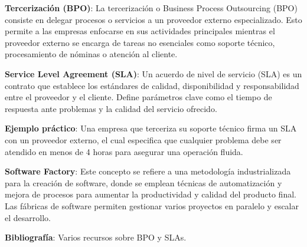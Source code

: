 \documentclass[a4paper,11pt]{article}
\begin{document}
\textbf{Tercerización (BPO)}: La tercerización o Business Process Outsourcing (BPO) consiste en delegar procesos o servicios a un proveedor externo especializado. Esto permite a las empresas enfocarse en sus actividades principales mientras el proveedor externo se encarga de tareas no esenciales como soporte técnico, procesamiento de nóminas o atención al cliente.

\textbf{Service Level Agreement (SLA)}: Un acuerdo de nivel de servicio (SLA) es un contrato que establece los estándares de calidad, disponibilidad y responsabilidad entre el proveedor y el cliente. Define parámetros clave como el tiempo de respuesta ante problemas y la calidad del servicio ofrecido.

\textbf{Ejemplo práctico}: Una empresa que terceriza su soporte técnico firma un SLA con un proveedor externo, el cual especifica que cualquier problema debe ser atendido en menos de 4 horas para asegurar una operación fluida.

\textbf{Software Factory}: Este concepto se refiere a una metodología industrializada para la creación de software, donde se emplean técnicas de automatización y mejora de procesos para aumentar la productividad y calidad del producto final. Las fábricas de software permiten gestionar varios proyectos en paralelo y escalar el desarrollo.

\textbf{Bibliografía}: Varios recursos sobre BPO y SLAs.
\end{document}
